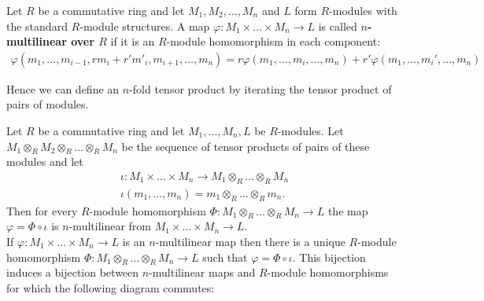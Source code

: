 \documentclass{memoir}
\begin{document}
\begin{defn}
	Let \(R\) be a commutative ring and  let \(M_1,M_2,\ldots,M_n\) and \(L\) form \(R\)-modules with the standard \(R\)-module structures. A map \(\varphi : M_1 \times  \ldots \times M_n \to L\) is called \textbf{\(n\)-multilinear over \(R\)} if it is an \(R\)-module homomorphism in each component:
	\begin{align*}
		\varphi (m_1,\ldots,m_{i-1},rm_i + r'm'_i, m_{i+1},\ldots,m_n) = r \varphi(m_1,\ldots,m_i,\ldots,m_n) + r' \varphi (m_1,\ldots,m_i', \ldots, m_n)
	\end{align*}
\end{defn}
Hence we can define an \(n\)-fold tensor product by iterating the tensor product of pairs of modules.

\begin{cor}
	Let \(R\) be a commutative ring and let \(M_1,\ldots,M_n,L\) be \(R\)-modules. Let \(M_1 \otimes_R M_{2} \otimes_R \ldots \otimes_R M_n\) be the sequence of tensor products of pairs of these modules and let
	\begin{align*}
		\iota:M_1\times \ldots \times M_n \to M_1 \otimes_R \ldots \otimes_R M_n\\
		\iota(m_1,\ldots,m_n) = m_1 \otimes_R \ldots \otimes_R m_n.
	\end{align*}
	Then for every \(R\)-module homomorphism \(\Phi : M_1 \otimes_R \ldots \otimes_R M_n \to L\) the map \(\varphi = \Phi \circ \iota\) is \(n\)-multilinear from \(M_1\times \ldots\times M_n\to L\).\\

	If \(\varphi :M_1\times \ldots\times M_n \to L\) is an \(n\)-multilinear map then there is a unique \(R\)-module homomorphism \(\Phi :M_1 \otimes_R \ldots \otimes_R M_n \to L\) such that \(\varphi  = \Phi \circ \iota\). This bijection induces a bijection between \(n\)-multilinear maps and \(R\)-module homomorphisms for which the following diagram commutes:
\begin{center}
\end{center}
\end{cor}
\end{document}
